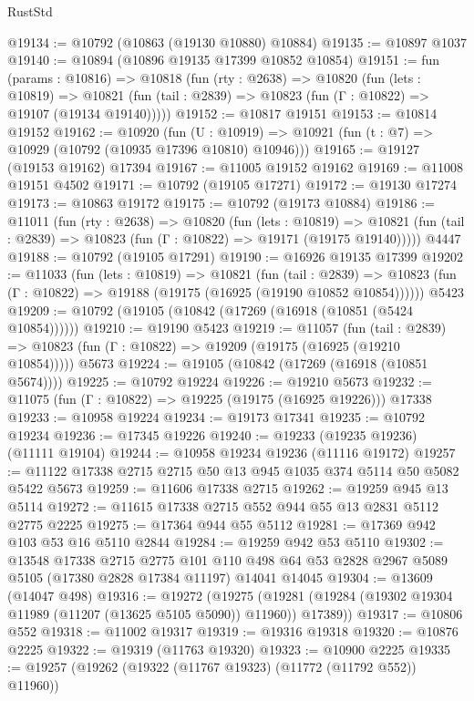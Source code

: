 \begin{lexlean}{RustStd}
\begin{coremodule}
@19134 := @10792 (@10863 (@19130 @10880) @10884)
@19135 := @10897 @1037
@19140 := @10894 (@10896 @19135 @17399 @10852 @10854)
@19151 := fun (params : @10816) =>
  @10818
    (fun (rty : @2638) =>
    @10820
      (fun (lets : @10819) =>
      @10821 (fun (tail : @2839) => @10823 (fun (Γ : @10822) => @19107 (@19134 @19140)))))
@19152 := @10817 @19151
@19153 := @10814 @19152
@19162 := @10920
    (fun (U : @10919) => @10921 (fun (t : @7) => @10929 (@10792 (@10935 @17396 @10810) @10946)))
@19165 := @19127 (@19153 @19162) @17394
@19167 := @11005 @19152 @19162
@19169 := @11008 @19151 @4502
@19171 := @10792 (@19105 @17271)
@19172 := @19130 @17274
@19173 := @10863 @19172
@19175 := @10792 (@19173 @10884)
@19186 := @11011
    (fun (rty : @2638) =>
    @10820
      (fun (lets : @10819) =>
      @10821 (fun (tail : @2839) => @10823 (fun (Γ : @10822) => @19171 (@19175 @19140)))))
    @4447
@19188 := @10792 (@19105 @17291)
@19190 := @16926 @19135 @17399
@19202 := @11033
    (fun (lets : @10819) =>
    @10821
      (fun (tail : @2839) =>
      @10823 (fun (Γ : @10822) => @19188 (@19175 (@16925 (@19190 @10852 @10854))))))
    @5423
@19209 := @10792 (@19105 (@10842 (@17269 (@16918 (@10851 (@5424 @10854))))))
@19210 := @19190 @5423
@19219 := @11057
    (fun (tail : @2839) => @10823 (fun (Γ : @10822) => @19209 (@19175 (@16925 (@19210 @10854)))))
    @5673
@19224 := @19105 (@10842 (@17269 (@16918 (@10851 @5674))))
@19225 := @10792 @19224
@19226 := @19210 @5673
@19232 := @11075 (fun (Γ : @10822) => @19225 (@19175 (@16925 @19226))) @17338
@19233 := @10958 @19224
@19234 := @19173 @17341
@19235 := @10792 @19234
@19236 := @17345 @19226
@19240 := @19233 (@19235 @19236) (@11111 @19104)
@19244 := @10958 @19234 @19236 (@11116 @19172)
@19257 := @11122 @17338 @2715 @2715 @50 @13 @945 @1035 @374 @5114 @50 @5082 @5422 @5673
@19259 := @11606 @17338 @2715
@19262 := @19259 @945 @13 @5114
@19272 := @11615 @17338 @2715 @552 @944 @55 @13 @2831 @5112 @2775 @2225
@19275 := @17364 @944 @55 @5112
@19281 := @17369 @942 @103 @53 @16 @5110 @2844
@19284 := @19259 @942 @53 @5110
@19302 := @13548
    @17338
    @2715
    @2775
    @101
    @110
    @498
    @64
    @53
    @2828
    @2967
    @5089
    @5105
    (@17380 @2828 @17384 @11197)
    @14041
    @14045
@19304 := @13609 (@14047 @498)
@19316 := @19272
    (@19275 (@19281 (@19284 (@19302 @19304 @11989 (@11207 (@13625 @5105 @5090)) @11960)) @17389))
@19317 := @10806 @552
@19318 := @11002 @19317
@19319 := @19316 @19318
@19320 := @10876 @2225
@19322 := @19319 (@11763 @19320)
@19323 := @10900 @2225
@19335 := @19257
    (@19262 (@19322 (@11767 @19323) (@11772 (@11792 @552)) @11960))

\end{coremodule}
\end{lexlean}

